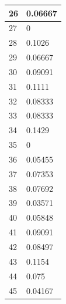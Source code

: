 \begin{tabular}{|l||l|}
	26 & 0.06667 \\ \hline
	27 & 0 \\ \hline
	28 & 0.1026 \\ \hline
	29 & 0.06667 \\ \hline
	30 & 0.09091 \\ \hline
	31 & 0.1111 \\ \hline
	32 & 0.08333 \\ \hline
	33 & 0.08333 \\ \hline
	34 & 0.1429 \\ \hline
	35 & 0 \\ \hline
	36 & 0.05455 \\ \hline
	37 & 0.07353 \\ \hline
	38 & 0.07692 \\ \hline
	39 & 0.03571 \\ \hline
	40 & 0.05848 \\ \hline
	41 & 0.09091 \\ \hline
	42 & 0.08497 \\ \hline
	43 & 0.1154 \\ \hline
	44 & 0.075 \\ \hline
	45 & 0.04167 \\ \hline
\end{tabular}

